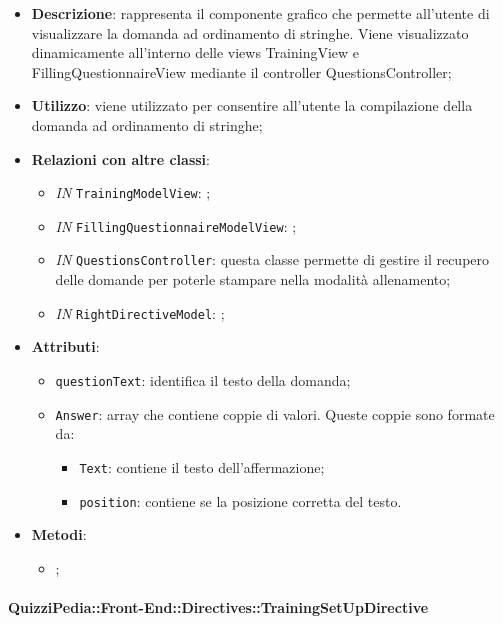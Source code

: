 		\begin{itemize}
			\item \textbf{Descrizione}: rappresenta il componente grafico che permette all'utente di visualizzare la domanda ad ordinamento di stringhe. Viene visualizzato dinamicamente all'interno delle views TrainingView e FillingQuestionnaireView mediante il controller QuestionsController;
			\item \textbf{Utilizzo}: viene utilizzato per consentire all'utente la compilazione della domanda ad ordinamento di stringhe;
			\item \textbf{Relazioni con altre classi}: 
			\begin{itemize}
				\item \textit{IN} \texttt{TrainingModelView}: ; 
				\item \textit{IN} \texttt{FillingQuestionnaireModelView}: ;
				\item \textit{IN} \texttt{QuestionsController}: questa classe permette di gestire il recupero delle domande per poterle stampare nella modalità allenamento;
				\item \textit{IN} \texttt{RightDirectiveModel}: ;
			\end{itemize}
			\item \textbf{Attributi}: 
			\begin{itemize}
				\item \texttt{questionText}: identifica il testo della domanda;
			\item \texttt{Answer}: array che contiene coppie di valori. Queste coppie sono formate da:
			\begin{itemize}
				\item \texttt{Text}: contiene il testo dell'affermazione;
				\item \texttt{position}: contiene se la posizione corretta del testo.
			\end{itemize}
			\end{itemize}
			\item \textbf{Metodi}: 
			\begin{itemize}
				\item ;
			\end{itemize}
		\end{itemize}
		
		\paragraph{QuizziPedia::Front-End::Directives::TrainingSetUpDirective}
		
